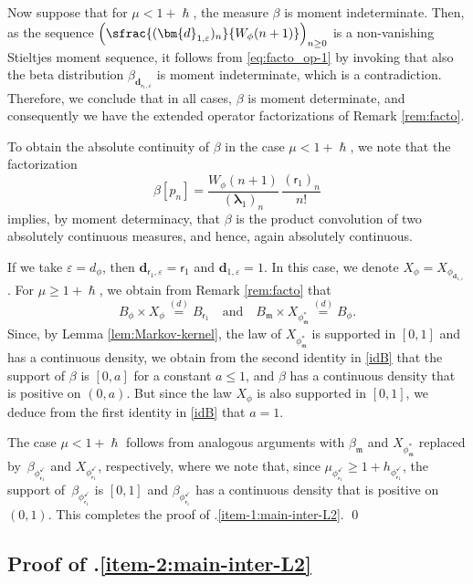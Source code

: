 \documentclass[JEP,XML,SOM,Unicode]{cedram}
\let\epsilon\varepsilon
\theoremstyle{plain}
\theoremstyle{definition}
\newcommand{\m}{\mathfrak{m}}
\newcommand{\dpt}{\bm{d}_{\vat,\epsilon}}
\newcommand{\dz}{{\bm{d}}_{1,\epsilon}}
\newcommand{\lam}{{\bm{\lambda}_1}}
\newcommand{\vat}{{\mathsf{r}_1}}
\newcommand{\phm}{{\phi_\m^*}}
\renewcommand{\varphi}{{\phi_{\vat}^{\checkmark}}}
\newcommand{\gab}[1][\lam,\mo]{{\beta_{#1}}}
\let\h\hslash
\let\mo\mu
\let\bpsi\beta
\begin{document}
Now suppose that for $\mo < 1+\h$, the measure $\bpsi$ is moment indeterminate. Then, as the sequence $\left(\sfrac{(\dz)_n}{W_{\phi}(n+1)}\right)_{n \geq 0}$ is a non-vanishing Stieltjes moment sequence, it follows from \eqref{eq:facto_op-1} by invoking \cite[Lem.\,2.2]{Berg} that also the beta distribution $\gab[\dpt]$ is moment indeterminate, which is a contradiction. Therefore, we conclude that in all cases, $\bpsi$ is moment determinate, and consequently we have the extended operator factorizations of Remark \ref{rem:facto}.

To obtain the absolute continuity of $\bpsi$ in the case $\mo < 1+\h$, we note that the factorization\vspace*{-3pt}
\[
\bpsi [p_n] = \frac{W_{\phi}(n+1)}{(\lam)_n}\,\frac{(\vat)_n}{n!}
\]
implies, by moment determinacy, that $\bpsi$ is the product convolution of two absolutely continuous measures, and hence, again absolutely continuous.

If we take $\epsilon = d_\phi$, then $\dpt = \vat$ and $\dz = 1$. In this case, we denote
$X_{\phi} = X_{\phi_{\dz}}$. For $\mo \ge 1 + \h$, we obtain from Remark \ref{rem:facto} that\vspace*{-3pt}
\begin{equation} \label{idB}
B_\phi \times X_{\phi} \stackrel{(d)}{=} B_{\vat} \quad \mbox{and} \quad
B_{\m} \times X_{\phi^*_{\m}} \stackrel{(d)}{=} B_{\phi}.
\end{equation}
Since, by Lemma \ref{lem:Markov-kernel}, the law of $X_{\phi^*_{\m}}$ is supported in $[0,1]$
and has a continuous density, we obtain from the second identity in \eqref{idB} that
the support of $\beta$ is $[0,a]$ for a constant $a \le 1$, and $\beta$ has a continuous
density that is positive on $(0,a)$. But since the law $X_{\phi}$ is also supported in $[0,1]$,
we deduce from the first identity in \eqref{idB} that $a = 1$.

The case $\mo < 1+\h$ follows from analogous arguments with $\gab[\m]$ and $X_{\phm}$ replaced by~$\bpsi_\varphi$ and $X_\varphi$, respectively, where we note that, since $\mo_\varphi \geq 1+h_\varphi$, the support of~$\bpsi_\varphi$ is $[0,1]$ and $\bpsi_\varphi$ has a continuous density that is positive on $(0,1)$. This completes the proof of .\eqref{item-1:main-inter-L2}. \qed

\subsection{Proof of .\eqref{item-2:main-inter-L2}}
\end{document}
